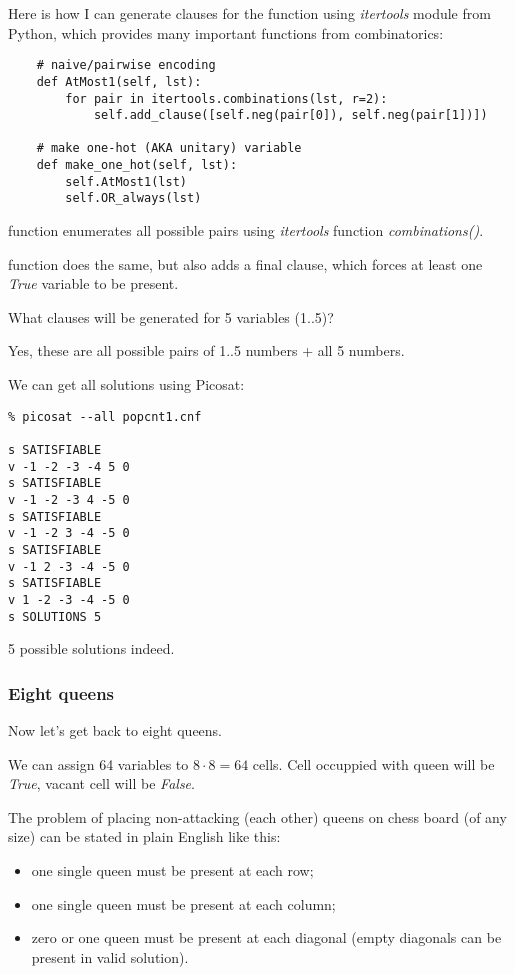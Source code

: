 Here is how I can generate clauses for the function using \textit{itertools} module from Python,
which provides many important functions from combinatorics:

\begin{lstlisting}
    # naive/pairwise encoding   
    def AtMost1(self, lst):
        for pair in itertools.combinations(lst, r=2):
            self.add_clause([self.neg(pair[0]), self.neg(pair[1])])
       
    # make one-hot (AKA unitary) variable
    def make_one_hot(self, lst):
        self.AtMost1(lst)
        self.OR_always(lst)
\end{lstlisting}

 function enumerates all possible pairs using \textit{itertools} function
\textit{combinations()}.

 function does the same, but also adds a final clause, which forces at least one
\textit{True} variable to be present.

What clauses will be generated for 5 variables (1..5)?



Yes, these are all possible pairs of 1..5 numbers + all 5 numbers.

We can get all solutions using Picosat:

\begin{lstlisting}
% picosat --all popcnt1.cnf

s SATISFIABLE
v -1 -2 -3 -4 5 0
s SATISFIABLE
v -1 -2 -3 4 -5 0
s SATISFIABLE
v -1 -2 3 -4 -5 0
s SATISFIABLE
v -1 2 -3 -4 -5 0
s SATISFIABLE
v 1 -2 -3 -4 -5 0
s SOLUTIONS 5
\end{lstlisting}

5 possible solutions indeed.

\subsubsection{Eight queens}

Now let's get back to eight queens.

We can assign 64 variables to $8 \cdot 8=64$ cells.
Cell occuppied with queen will be \textit{True}, vacant cell will be \textit{False}.

The problem of placing non-attacking (each other) queens on chess board (of any size) can be stated in plain English like this:
\begin{itemize}
\item one single queen must be present at each row;

\item one single queen must be present at each column;

\item zero or one queen must be present at each diagonal (empty diagonals can be present in valid solution).
\end{itemize}

